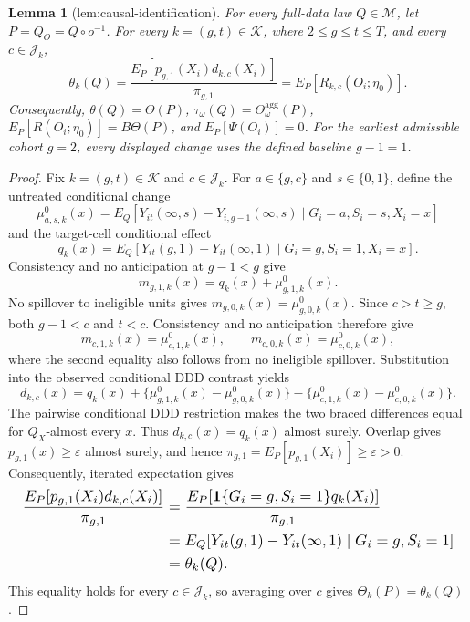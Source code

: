 \documentclass{article}
\newtheorem{lemma}{Lemma}
\begin{document}
\begin{lemma}[lem:causal-identification]\label{lem:causal-identification}
For every full-data law \(Q\in\mathcal M\), let \(P=Q_O=Q\circ o^{-1}\). For every \(k=(g,t)\in\mathcal K\), where \(2\le g\le t\le T\), and every \(c\in\mathcal J_k\), \[\theta_k(Q)=\frac{E_P[p_{g,1}(X_i)d_{k,c}(X_i)]}{\pi_{g,1}}=E_P[R_{k,c}(O_i;\eta_0)].\] Consequently, \(\theta(Q)=\Theta(P)\), \(\tau_\omega(Q)=\Theta_\omega^{\mathrm{agg}}(P)\), \(E_P[R(O_i;\eta_0)]=B\Theta(P)\), and \(E_P[\Psi(O_i)]=0\). For the earliest admissible cohort \(g=2\), every displayed change uses the defined baseline \(g-1=1\).
\end{lemma}
\begin{proof}
Fix \(k=(g,t)\in\mathcal K\) and \(c\in\mathcal J_k\). For \(a\in\{g,c\}\) and \(s\in\{0,1\}\), define the untreated conditional change
\[
 \mu^0_{a,s,k}(x)
 =E_Q\!\left[Y_{it}(\infty,s)-Y_{i,g-1}(\infty,s)
       \mid G_i=a,S_i=s,X_i=x\right]
\]
and the target-cell conditional effect
\[
 q_k(x)=E_Q\!\left[Y_{it}(g,1)-Y_{it}(\infty,1)
       \mid G_i=g,S_i=1,X_i=x\right].
\]
Consistency and no anticipation at \(g-1<g\) give
\[
 m_{g,1,k}(x)=q_k(x)+\mu^0_{g,1,k}(x).
\]
No spillover to ineligible units gives \(m_{g,0,k}(x)=\mu^0_{g,0,k}(x)\). Since \(c>t\ge g\), both \(g-1<c\) and \(t<c\). Consistency and no anticipation therefore give
\[
 m_{c,1,k}(x)=\mu^0_{c,1,k}(x),
 \qquad
 m_{c,0,k}(x)=\mu^0_{c,0,k}(x),
\]
where the second equality also follows from no ineligible spillover. Substitution into the observed conditional DDD contrast yields
\[
 d_{k,c}(x)=q_k(x)
 +\{\mu^0_{g,1,k}(x)-\mu^0_{g,0,k}(x)\}
 -\{\mu^0_{c,1,k}(x)-\mu^0_{c,0,k}(x)\}.
\]
The pairwise conditional DDD restriction makes the two braced differences equal for \(Q_X\)-almost every \(x\). Thus \(d_{k,c}(x)=q_k(x)\) almost surely. Overlap gives \(p_{g,1}(x)\ge\varepsilon\) almost surely, and hence \(\pi_{g,1}=E_P[p_{g,1}(X_i)]\ge\varepsilon>0\). Consequently, iterated expectation gives
\[
\makebox[\linewidth][c]{\resizebox{0.98\linewidth}{!}{\(\displaystyle \begin{aligned}
 \frac{E_P[p_{g,1}(X_i)d_{k,c}(X_i)]}{\pi_{g,1}}
 &=\frac{E_P[\mathbf 1\{G_i=g,S_i=1\}q_k(X_i)]}{\pi_{g,1}}\\
 &=E_Q[Y_{it}(g,1)-Y_{it}(\infty,1)\mid G_i=g,S_i=1]\\
 &=\theta_k(Q).
\end{aligned}\)}}
\]
This equality holds for every \(c\in\mathcal J_k\), so averaging over \(c\) gives \(\Theta_k(P)=\theta_k(Q)\).


\end{proof}
\end{document}
